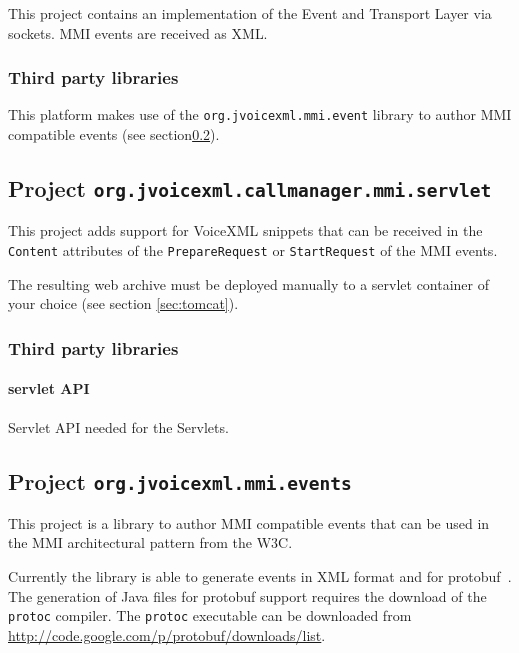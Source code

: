 \documentclass[11pt,a4paper]{article}
\begin{document}
This project contains an implementation of the Event and Transport Layer
via sockets. MMI events are received as XML.

\subsubsection{Third party libraries}

This platform makes use of the \lstinline{org.jvoicexml.mmi.event} library
to author MMI compatible events (see section\ref{sec:mmi-events}).


\subsection{Project \texttt{org.jvoicexml.callmanager.mmi.servlet}}
\label{sec:mmi-servlet}

This project adds support for VoiceXML snippets that can be received
in the \lstinline{Content} attributes of the \lstinline{PrepareRequest}
or \lstinline{StartRequest} of the MMI events.

The resulting web archive must be deployed manually to a servlet container
of your choice (see section \ref{sec:tomcat}).

\subsubsection{Third party libraries}

\paragraph{servlet API}

Servlet API needed for the Servlets.

\subsection{Project \texttt{org.jvoicexml.mmi.events}}
\label{sec:mmi-events}

This project is a library to author MMI compatible events that can be used in
the MMI architectural pattern from the W3C.

Currently the library is able to generate events in XML format and for
protobuf~\cite{google:protobuf}. The generation of Java files for protobuf
support requires the download of the \texttt{protoc} compiler. The \texttt{protoc}
executable can be downloaded from \url{http://code.google.com/p/protobuf/downloads/list}.
\end{document}
